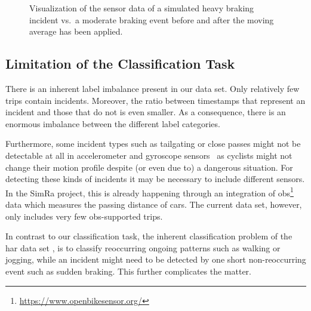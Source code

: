 \begin{figure}
\begin{subfigure}[b]{0.475\textwidth}
	\end{subfigure}
	\caption{Visualization of the sensor data of a simulated heavy braking incident vs.\ a moderate braking event before and after the moving average has been applied.}
	\label{fig:heavy-vs-normal-braking}
\end{figure}

\subsection{Limitation of the Classification Task}
\label{subsec:limitation_of_the_classification_task}
There is an inherent label imbalance present in our data set.
Only relatively few trips contain incidents.
Moreover, the ratio between timestamps that represent an incident and those that do not is even smaller.
As a consequence, there is an enormous imbalance between the different label categories.

Furthermore, some incident types such as tailgating or close passes might not be detectable at all in accelerometer and gyroscope sensors~\cite{aldred2018predictors, karakaya2020simra} as cyclists might not change their motion profile despite (or even due to) a dangerous situation.
For detecting these kinds of incidents it may be necessary to include different sensors.
In the SimRa project, this is already happening through an integration of \ac{obs}\footnote{\url{https://www.openbikesensor.org/}} data which measures the passing distance of cars.
The current data set, however, only includes very few \ac{obs}-supported trips.

In contrast to our classification task, the inherent classification problem of the \ac{har} data set \cite{anguita2013public}, is to classify reoccurring ongoing patterns such as walking or jogging, while an incident might need to be detected by one short non-reoccurring event such as sudden braking.
This further complicates the matter.

